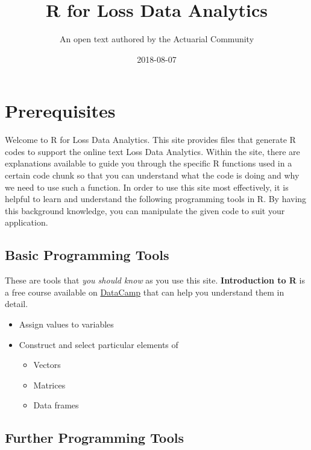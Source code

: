 \documentclass[]{book}
\title{R for Loss Data Analytics}
\author{An open text authored by the Actuarial Community}
\date{2018-08-07}
\providecommand{\tightlist}{%
  \setlength{\itemsep}{0pt}\setlength{\parskip}{0pt}}
\theoremstyle{definition}
\theoremstyle{definition}
\theoremstyle{definition}
\theoremstyle{remark}
\begin{document}
\maketitle

{
\setcounter{tocdepth}{1}
\tableofcontents
}
\chapter*{Prerequisites}\label{prerequisites}

Welcome to R for Loss Data Analytics. This site provides files that
generate R codes to support the online text Loss Data Analytics. Within
the site, there are explanations available to guide you through the
specific R functions used in a certain code chunk so that you can
understand what the code is doing and why we need to use such a
function. In order to use this site most effectively, it is helpful to
learn and understand the following programming tools in R. By having
this background knowledge, you can manipulate the given code to suit
your application.

\section{Basic Programming Tools}\label{basic-programming-tools}

These are tools that \emph{you should know} as you use this site.
\textbf{Introduction to R} is a free course available on
\href{https://www.datacamp.com/}{DataCamp} that can help you understand
them in detail.

\begin{itemize}
\tightlist
\item
  Assign values to variables
\item
  Construct and select particular elements of

  \begin{itemize}
  \tightlist
  \item
    Vectors
  \item
    Matrices
  \item
    Data frames
  \end{itemize}
\end{itemize}

\section{Further Programming Tools}\label{further-programming-tools}
\end{document}
